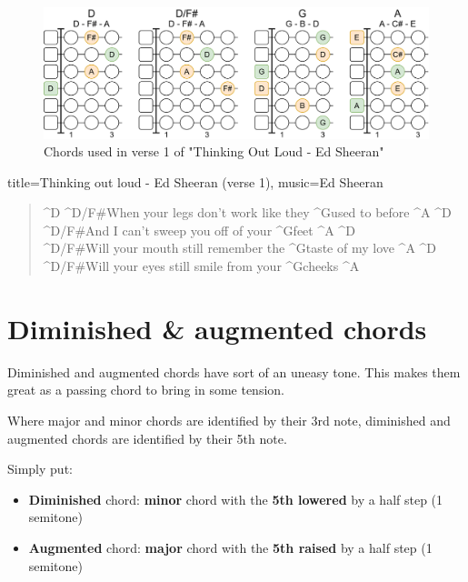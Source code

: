 \begin{figure}[h]
	\centering
	\includegraphics[height=0.16\textheight]{../../Images/EdSheeranThinkingOutLoudVerseChords.png}
	\caption{Chords used in verse 1 of "Thinking Out Loud - Ed Sheeran"}
	\label{fig:guitar_chords_verse_1_thinking_out_loud_ed_sheeran}
\end{figure}


\begin{song}[verse/numbered, align-chords=l]{title={Thinking out loud - Ed Sheeran (verse 1)}, music={Ed Sheeran}}
	\begin{verse}
		^{D} ^{D/F#}When your legs don't work like they ^{G}used to before ^{A} ^{D} \\
		^{D/F#}And I can't sweep you off of your ^{G}feet ^{A} ^{D} \\
		^{D/F#}Will your mouth still remember the ^{G}taste of my love ^{A} ^{D} \\
		^{D/F#}Will your eyes still smile from your ^{G}cheeks ^{A} \\
	\end{verse}
\end{song}


\newpage

\section{Diminished \& augmented chords}

Diminished and augmented chords have sort of an uneasy tone. This makes them great as a passing chord to bring in some tension.

Where major and minor chords are identified by their 3rd note, diminished and augmented chords are identified by their 5th note.

Simply put:

\begin{itemize}
	\item \textbf{Diminished} chord: \textbf{minor} chord with the \textbf{5th lowered} by a half step (1 semitone)
	\item \textbf{Augmented} chord: \textbf{major} chord with the \textbf{5th raised} by a half step (1 semitone)
\end{itemize}

